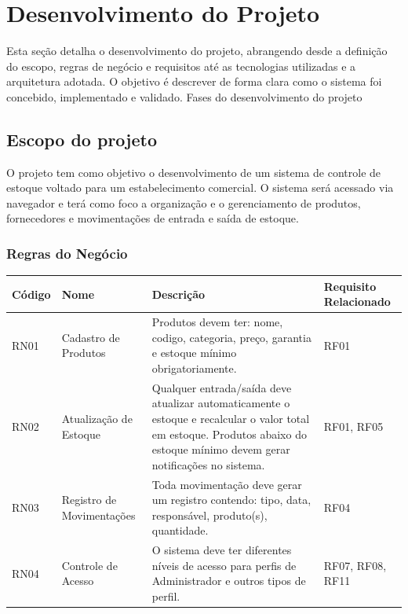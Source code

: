 \documentclass[
	12pt,				%
	openany,			%
	twoside,			%
	a4paper,			%
	english,			%
	brazil				%
	]{abntex2}
\begin{document}
\chapter{Desenvolvimento do Projeto}

Esta seção detalha o desenvolvimento do projeto, abrangendo desde a definição do escopo, regras de negócio e requisitos até as tecnologias utilizadas e a arquitetura adotada. O objetivo é descrever de forma clara como o sistema foi concebido, implementado e validado.
Fases do desenvolvimento do projeto
\section{Escopo do projeto}

O projeto tem como objetivo o desenvolvimento de um sistema de controle de estoque voltado para um estabelecimento comercial. O sistema será acessado via navegador e terá como foco a organização e o gerenciamento de produtos, fornecedores e movimentações de entrada e saída de estoque.




\subsection{Regras do Negócio}



\begin{quadro}[htb]
\centering
\caption{\label{quadro_rn1}Regras de Negócio (RN01 a RN04)}
\centering
\begin{tabular}{|p{1.6cm}|p{4.0cm}|p{7.5cm}|p{2.0cm}|}
    \hline
    \textbf{Código} & \textbf{Nome} & \textbf{Descrição} & \textbf{Requisito Relacionado} \\ \hline

    RN01 & Cadastro de Produtos & Produtos devem ter: nome, codigo, categoria, preço, garantia e estoque mínimo obrigatoriamente. & RF01 \\ \hline

RN02 & Atualização de Estoque & Qualquer entrada/saída deve atualizar automaticamente o estoque e recalcular o valor total em estoque. Produtos abaixo do estoque mínimo devem gerar notificações no sistema. & RF01, RF05 \\ \hline


RN03 & Registro de Movimentações & Toda movimentação deve gerar um registro contendo: tipo, data, responsável, produto(s), quantidade. & RF04 \\ \hline


RN04 & Controle de Acesso & O sistema deve ter diferentes níveis de acesso para perfis de Administrador e outros tipos de perfil. & RF07, RF08, RF11 \\ \hline

    

\end{tabular}
\end{quadro}
\end{document}
